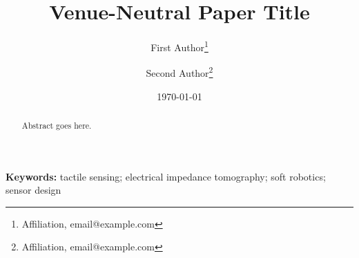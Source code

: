 \documentclass[11pt,a4paper]{article}
\title{Venue-Neutral Paper Title}
\author{
  First Author\thanks{Affiliation, email@example.com}
  \and
  Second Author\thanks{Affiliation, email@example.com}
}
\date{\today}
\begin{document}
\maketitle

\begin{abstract}
Abstract goes here.
\end{abstract}

\noindent\textbf{Keywords:} tactile sensing; electrical impedance tomography; soft robotics; sensor design









\printbibliography
\end{document}

